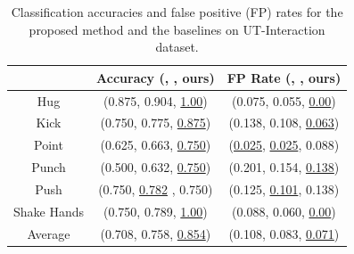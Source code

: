 \begin{table}[ht]
\centering \caption{Classification accuracies and false positive (FP) rates for the proposed method and the baselines on UT-Interaction dataset.}
\footnotesize{
\begin{tabular}{|c||c|c|}
\hline   & Accuracy (\cite{Ryoo:group}, \cite{Amer:group}, ours) & FP Rate (\cite{Ryoo:group}, \cite{Amer:group}, ours) \\
\hline Hug &  (0.875, 0.904, \underline{1.00}) & (0.075, 0.055, \underline{0.00}) \\
\hline Kick &  (0.750, 0.775, \underline{0.875})  & (0.138, 0.108, \underline{0.063})\\
\hline Point & (0.625, 0.663,  \underline{0.750}) & (\underline{0.025}, \underline{0.025}, 0.088)\\
\hline Punch & (0.500, 0.632, \underline{0.750})  & (0.201, 0.154,  \underline{0.138})\\
\hline Push & (0.750, \underline{0.782} , 0.750)  & (0.125, \underline{0.101},  0.138)\\
\hline Shake Hands &  (0.750, 0.789, \underline{1.00}) & (0.088, 0.060, \underline{0.00}) \\
\hline\hline Average &  (0.708, 0.758, \underline{0.854})  & (0.108, 0.083,  \underline{0.071})\\
\hline 
\end{tabular}
}
\label{UTaccuFP}
\end{table}


